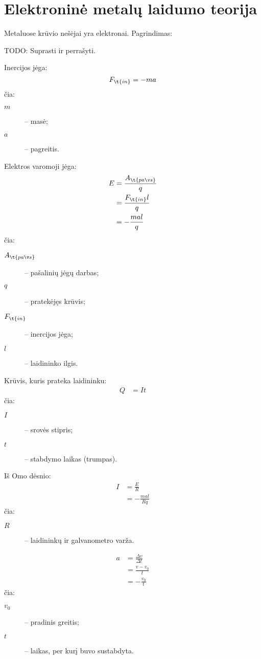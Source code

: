 \section{Elektroninė metalų laidumo teorija}

Metaluose krūvio nešėjai yra elektronai. Pagrindimas:

TODO: Suprasti ir perrašyti.

Inercijos jėga:
\begin{equation*}
  F_{\t{in}} = -ma
\end{equation*}
čia:
\begin{description}
  \item[$m$] – masė;
  \item[$a$] – pagreitis.
\end{description}

Elektros varomoji jėga:
\begin{align*}
  E &= \frac{A_{\t{paš}}}{q} \\
  &= \frac{F_{\t{in}} l}{q} \\
  &= -\frac{mal}{q}
\end{align*}
čia:
\begin{description}
  \item[$A_{\t{paš}}$] – pašalinių jėgų darbas;
  \item[$q$] – pratekėjęs krūvis;
  \item[$F_{\t{in}}$] – inercijos jėga;
  \item[$l$] – laidininko ilgis.
\end{description}

Krūvis, kuris prateka laidininku:
\begin{align*}
  Q &= I t
\end{align*}
čia:
\begin{description}
  \item[$I$] – srovės stipris;
  \item[$t$] – stabdymo laikas (trumpas).
\end{description}

Iš Omo dėsnio:
\begin{align*}
  I &= \frac{E}{R} \\
  &= -\frac{mal}{Rq}
\end{align*}
čia:
\begin{description}
  \item[$R$] – laidininkų ir galvanometro varža.
\end{description}

\begin{align*}
  a &= \frac{\Delta v}{\Delta t} \\
  &= \frac{v - v_{0}}{t} \\
  &= -\frac{v_{0}}{t}
\end{align*}
čia:
\begin{description}
  \item[$v_{0}$] – pradinis greitis;
  \item[$t$] – laikas, per kurį buvo sustabdyta.
\end{description}

